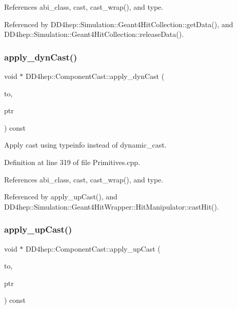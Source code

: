 References abi\+\_\+class, cast, cast\+\_\+wrap(), and type.



Referenced by D\+D4hep\+::\+Simulation\+::\+Geant4\+Hit\+Collection\+::get\+Data(), and D\+D4hep\+::\+Simulation\+::\+Geant4\+Hit\+Collection\+::release\+Data().

\hypertarget{class_d_d4hep_1_1_component_cast_a8046aba225c46b5e6eb7dedb49c27545}{}\label{class_d_d4hep_1_1_component_cast_a8046aba225c46b5e6eb7dedb49c27545} 
\subsubsection{\texorpdfstring{apply\+\_\+dyn\+Cast()}{apply\_dynCast()}}
{\footnotesize\ttfamily void $\ast$ D\+D4hep\+::\+Component\+Cast\+::apply\+\_\+dyn\+Cast (\begin{DoxyParamCaption}\item[{const \hyperlink{class_d_d4hep_1_1_component_cast}{Component\+Cast} \&}]{to,  }\item[{const void $\ast$}]{ptr }\end{DoxyParamCaption}) const}



Apply cast using typeinfo instead of dynamic\+\_\+cast. 



Definition at line 319 of file Primitives.\+cpp.



References abi\+\_\+class, cast, cast\+\_\+wrap(), and type.



Referenced by apply\+\_\+up\+Cast(), and D\+D4hep\+::\+Simulation\+::\+Geant4\+Hit\+Wrapper\+::\+Hit\+Manipulator\+::cast\+Hit().

\hypertarget{class_d_d4hep_1_1_component_cast_a72d76b159970004a307c6337f6a9292d}{}\label{class_d_d4hep_1_1_component_cast_a72d76b159970004a307c6337f6a9292d} 
\subsubsection{\texorpdfstring{apply\+\_\+up\+Cast()}{apply\_upCast()}}
{\footnotesize\ttfamily void $\ast$ D\+D4hep\+::\+Component\+Cast\+::apply\+\_\+up\+Cast (\begin{DoxyParamCaption}\item[{const \hyperlink{class_d_d4hep_1_1_component_cast}{Component\+Cast} \&}]{to,  }\item[{const void $\ast$}]{ptr }\end{DoxyParamCaption}) const}



